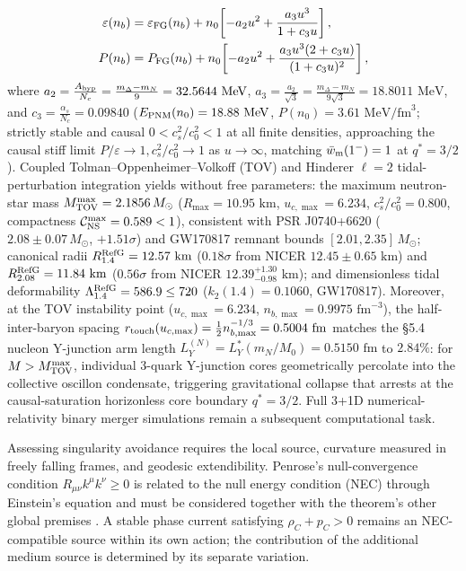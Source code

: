\documentclass[11pt,a4paper]{article}
\begin{document}
\begin{enumerate}[label=\arabic*.]
\begin{equation}
\begin{aligned}
\varepsilon(n_b) &= \varepsilon_{\rm FG}(n_b) + n_0\!\left[-a_2 u^2 + \frac{a_3 u^3}{1 + c_3 u}\right], \\
P(n_b) &= P_{\rm FG}(n_b) + n_0\!\left[-a_2 u^2 + \frac{a_3 u^3(2 + c_3 u)}{(1 + c_3 u)^2}\right],
\end{aligned}
\end{equation}
where $a_2 = \frac{A_{\rm hyp}}{N_c} = \frac{m_\Delta - m_N}{9} = 32.5644\text{ MeV}$, $a_3 = \frac{a_2}{\sqrt{3}} = \frac{m_\Delta - m_N}{9\sqrt{3}} = 18.8011\text{ MeV}$, and $c_3 = \frac{\alpha_s}{N_c} = 0.09840$ ($E_{\rm PNM}(n_0) = 18.88\text{ MeV}$, $P(n_0) = 3.61\text{ MeV/fm}^3$; strictly stable and causal $0 < c_s^2/c_0^2 < 1$ at all finite densities, approaching the causal stiff limit $P/\varepsilon \to 1, c_s^2/c_0^2 \to 1$ as $u \to \infty$, matching $\bar{w}_{\rm m}(1^-) = 1$ at $q^* = 3/2$). Coupled Tolman--Oppenheimer--Volkoff (TOV) and Hinderer $\ell=2$ tidal-perturbation integration yields without free parameters: the maximum neutron-star mass \textbf{$M_{\rm TOV}^{\max} = 2.1856\,M_\odot$} ($R_{\max} = 10.95\text{ km}$, $u_{c,\max} = 6.234$, $c_s^2/c_0^2 = 0.800$, compactness $\mathcal{C}_{\rm NS}^{\max} = 0.589 < 1$), consistent with PSR J0740+6620 ($2.08 \pm 0.07\,M_\odot$, $+1.51\sigma$) and GW170817 remnant bounds $[2.01, 2.35]\,M_\odot$; canonical radii \textbf{$R_{1.4}^{\rm RefG} = 12.57\text{ km}$} (\textbf{$0.18\sigma$} from NICER $12.45 \pm 0.65\text{ km}$) and \textbf{$R_{2.08}^{\rm RefG} = 11.84\text{ km}$} (\textbf{$0.56\sigma$} from NICER $12.39^{+1.30}_{-0.98}\text{ km}$); and dimensionless tidal deformability \textbf{$\Lambda_{1.4}^{\rm RefG} = 586.9 \le 720$} ($k_2(1.4) = 0.1060$, GW170817). Moreover, at the TOV instability point ($u_{c,\max} = 6.234$, $n_{b,\max} = 0.9975\text{ fm}^{-3}$), the half-inter-baryon spacing $r_{\rm touch}(u_{c,\max}) = \frac{1}{2}n_{b,\max}^{-1/3} = 0.5004\text{ fm}$ matches the \S 5.4 nucleon Y-junction arm length $L_Y^{(N)} = L_Y^*(m_N/M_0) = 0.5150\text{ fm}$ to \textbf{$2.84\%$}: for $M > M_{\rm TOV}^{\max}$, individual 3-quark Y-junction cores geometrically percolate into the collective oscillon condensate, triggering gravitational collapse that arrests at the causal-saturation horizonless core boundary $q^* = 3/2$. Full 3+1D numerical-relativity binary merger simulations remain a subsequent computational task.
\end{enumerate}

Assessing singularity avoidance requires the local source, curvature measured in freely falling frames, and geodesic extendibility. Penrose's null-convergence condition $R_{\mu\nu}k^\mu k^\nu\ge0$ is related to the null energy condition (NEC) through Einstein's equation and must be considered together with the theorem's other global premises \citep{penrose1965}. A stable phase current satisfying $\rho_C+p_C>0$ remains an NEC-compatible source within its own action; the contribution of the additional medium source is determined by its separate variation.
\end{document}
